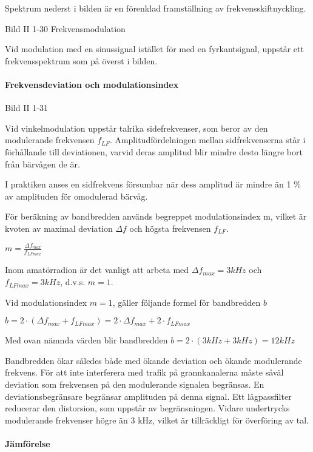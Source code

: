 \documentclass[a4paper,twoside,twocolumn,openright]{book}
\begin{document}
Spektrum nederst i bilden är en förenklad framställning av frekvensskiftnyckling.

Bild II 1-30 Frekvensmodulation

Vid modulation med en sinussignal istället för med en fyrkantsignal, uppstår ett
frekvensspektrum som på överst i bilden.

\paragraph{Frekvensdeviation och modulationsindex}

Bild II 1-31

Vid vinkelmodulation uppstår talrika sidefrekvenser, som beror av den modulerande
frekvensen $f_{LF}$. Amplitudfördelningen mellan sidfrekvenserna står i förhållande till
deviationen, varvid deras amplitud blir mindre desto längre bort från bärvågen de är.

I praktiken anses en sidfrekvens försumbar när dess amplitud är mindre än 1 \% av
amplituden för omodulerad bärvåg.

För beräkning av bandbredden används begreppet modulationsindex m, vilket är kvoten av
maximal deviation $\Delta f$ och högsta frekvensen $f_{LF}$.

$m = \frac{\Delta f_{max}}{f_{LFmax}}$

Inom amatörradion är det vanligt att arbeta med $\Delta f_{max} = 3 kHz$ och
$f_{LFmax} = 3 kHz$, d.v.s. $m = 1$.

Vid modulationsindex $m = 1$, gäller följande
formel för bandbredden $b$

$b = 2 \cdot ( \Delta f_{max} + f_{LFmax}) = 2 \cdot \Delta f_{max} + 2 \cdot f_{LFmax}$

Med ovan nämnda värden blir bandbredden $b = 2 \cdot (3 kHz + 3 kHz) = 12 kHz$

Bandbredden ökar således både med ökande deviation och ökande modulerande frekvens. För
att inte interferera med trafik på grannkanalerna måste såväl deviation som frekvensen på
den modulerande signalen begränsas. En deviationsbegränsare begränsar amplituden på denna
signal. Ett lågpassfilter reducerar den distorsion, som uppstår av begränsningen. Vidare
undertrycks modulerande frekvenser högre än 3 kHz, vilket är tillräckligt för överföring
av tal.

\paragraph{Jämförelse}
\end{document}
